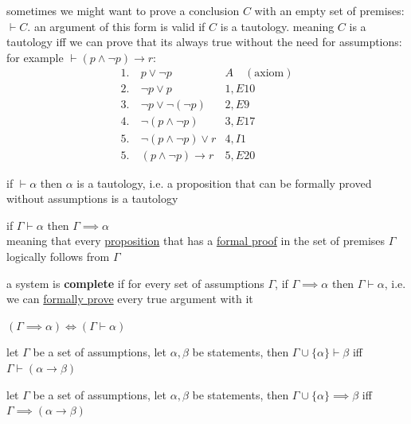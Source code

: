 \documentclass[a4paper,12pt]{article}
\begin{document}
sometimes we might want to prove a conclusion \(C\) with an empty set of premises: \(\vdash C\). an argument of this form is valid if \(C\) is a tautology. meaning \(C\) is a tautology iff we can prove that its always true without the need for assumptions: for example \(\vdash (p \land \lnot p) \to r\):\\[0pt]
\begin{align*}
  1.\ & p \lor \lnot p & A \quad (\text{axiom})\\
  2.\ & \lnot p \lor p & 1,E10\\
  3.\ & \lnot p \lor \lnot (\lnot p) & 2,E9\\
  4.\ & \lnot (p \land \lnot p) & 3,E17\\
  5.\ & \lnot (p \land \lnot p) \lor r & 4,I1\\
  5.\ & (p \land \lnot p) \to r & 5,E20
\end{align*}
\begin{lemma}
if \(\vdash \alpha\) then \(\alpha\) is a tautology, i.e. a proposition that can be formally proved without assumptions is a tautology\\[0pt]
\end{lemma}
\begin{lemma}
if \(\Gamma \vdash \alpha\) then \(\Gamma \implies \alpha\)\\[0pt]
meaning that every \href{20230401175139-statement.org}{proposition} that has a \href{20230525071323-formal_proof.org}{formal proof} in the set of premises \(\Gamma\) logically follows from \(\Gamma\)\\[0pt]
\end{lemma}
\begin{definition}
a system is \textbf{complete} if for every set of assumptions \(\Gamma\), if \(\Gamma \implies \alpha\) then \(\Gamma \vdash \alpha\), i.e. we can \href{20230525071323-formal_proof.org}{formally prove} every true argument with it\\[0pt]
\begin{lemma}
\((\Gamma \implies \alpha) \iff (\Gamma \vdash \alpha)\)\\[0pt]
\end{lemma}
\begin{lemma}
let \(\Gamma\) be a set of assumptions, let \(\alpha,\beta\) be statements, then \(\Gamma \cup \{\alpha\} \vdash \beta\) iff \(\Gamma \vdash (\alpha \to \beta)\)\\[0pt]
\end{lemma}
\begin{lemma}
let \(\Gamma\) be a set of assumptions, let \(\alpha,\beta\) be statements, then \(\Gamma \cup \{\alpha\} \implies \beta\) iff \(\Gamma \implies (\alpha \to \beta)\)\\[0pt]
\end{lemma}
\end{definition}
\end{document}
